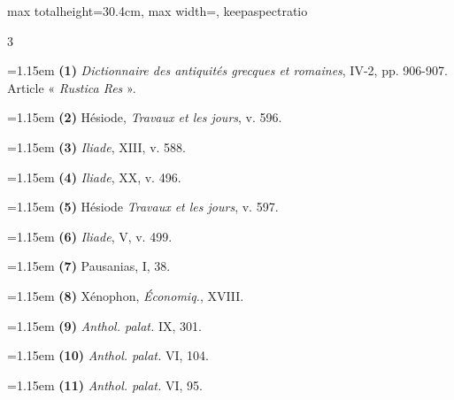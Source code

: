 \documentclass[11pt,twoside]{book}
\newcommand{\italique}[1]{\textit{#1}}
\newcommand{\latin}[1]{\textit{#1}}
\begin{document}
\begin{adjustbox}{max totalheight=30.4cm, max width=\textwidth, keepaspectratio}
\begin{minipage}{\textwidth}
{\begin{multicols}{3}
\par\vspace{1.5pt}
\par\vspace{1.2pt}\par\nopagebreak\vspace{1pt}\noindent\hangindent=1.15em {\color{sepiaNote}\textbf{(1)}} \italique{Dictionnaire des antiquités grecques et romaines}, IV-2, pp. 906-907. Article « \latin{Rustica Res} ».
\par\vspace{1.5pt}
\noindent\hangindent=1.15em {\color{sepiaNote}\textbf{(2)}} Hésiode, \italique{Travaux et les jours}, v. 596.
\par\vspace{1.5pt}
\noindent\hangindent=1.15em {\color{sepiaNote}\textbf{(3)}} \italique{Iliade}, XIII, v. 588.
\par\vspace{1.5pt}
\noindent\hangindent=1.15em {\color{sepiaNote}\textbf{(4)}} \italique{Iliade}, XX, v. 496.
\par\vspace{1.5pt}
\noindent\hangindent=1.15em {\color{sepiaNote}\textbf{(5)}} Hésiode \italique{Travaux et les jours}, v. 597.
\par\vspace{1.5pt}
\noindent\hangindent=1.15em {\color{sepiaNote}\textbf{(6)}} \italique{Iliade}, V, v. 499.
\par\vspace{1.5pt}
\noindent\hangindent=1.15em {\color{sepiaNote}\textbf{(7)}} Pausanias, I, 38.
\par\vspace{1.5pt}
\noindent\hangindent=1.15em {\color{sepiaNote}\textbf{(8)}} Xénophon, \italique{Économiq.}, XVIII.
\par\vspace{1.5pt}
\noindent\hangindent=1.15em {\color{sepiaNote}\textbf{(9)}} \italique{Anthol. palat.} IX, 301.
\par\vspace{1.5pt}
\noindent\hangindent=1.15em {\color{sepiaNote}\textbf{(10)}} \italique{Anthol. palat.} VI, 104.
\par\vspace{1.5pt}
\noindent\hangindent=1.15em {\color{sepiaNote}\textbf{(11)}} \italique{Anthol. palat.} VI, 95.

\end{multicols}}
\end{minipage}
\end{adjustbox}
\end{document}
